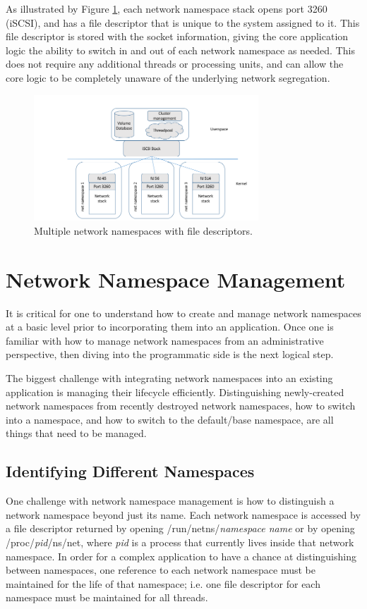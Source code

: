 \documentclass[letterpaper]{article}
\begin{document}
As illustrated by Figure \ref{namespace-fds}, each network namespace stack opens port 3260 (iSCSI), and has a file descriptor that is unique to the system assigned to it. This file descriptor is stored with the socket information, giving the core application logic the ability to switch in and out of each network namespace as needed. This does not require any additional threads or processing units, and can allow the core logic to be completely unaware of the underlying network segregation.

\begin{figure}[h]
\includegraphics[width=3.31in]{multiple-namespaces-with-fd.png}
\caption{Multiple network namespaces with file descriptors.}
\label{namespace-fds}
\end{figure}

\section{Network Namespace Management}
It is critical for one to understand how to create and manage network namespaces at a basic level\cite{edge2014} prior to incorporating them into an application. Once one is familiar with how to manage network namespaces from an administrative perspective, then diving into the programmatic side is the next logical step\cite{man2016}.

The biggest challenge with integrating network namespaces into an existing application is managing their lifecycle efficiently. Distinguishing newly-created network namespaces from recently destroyed network namespaces, how to switch into a namespace, and how to switch to the default/base namespace, are all things that need to be managed.

\subsection{Identifying Different Namespaces}
One challenge with network namespace management is how to distinguish a network namespace beyond just its name. Each network namespace is accessed by a file descriptor returned by opening /run/netns/\textit{namespace name} or by opening /proc/\textit{pid}/ns/net, where \textit{pid} is a process that currently lives inside that network namespace. In order for a complex application to have a chance at distinguishing between namespaces, one reference to each network namespace must be maintained for the life of that namespace; i.e. one file descriptor for each namespace must be maintained for all threads.
\end{document}
